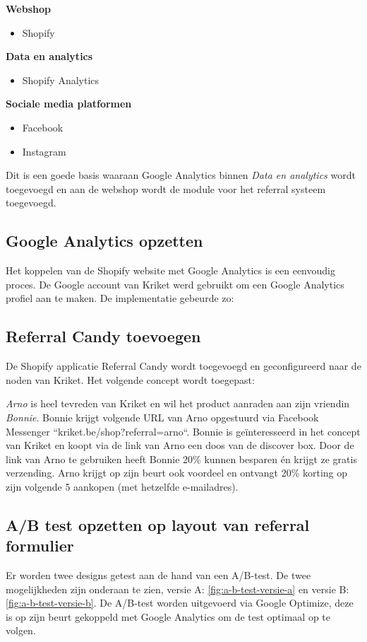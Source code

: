 \textbf{Webshop}
\begin{itemize}
	\item Shopify
\end{itemize}

\textbf{Data en analytics}
\begin{itemize}
	\item Shopify Analytics
\end{itemize}

\textbf{Sociale media platformen}
\begin{itemize}
	\item Facebook
	\item Instagram
\end{itemize}

Dit is een goede basis waaraan Google Analytics binnen \emph{Data en analytics} wordt toegevoegd en aan de webshop wordt de module voor het referral systeem toegevoegd.

\subsection{Google Analytics opzetten} \label{sec:google-analytics-opzetten}
Het koppelen van de Shopify website met Google Analytics is een eenvoudig proces. De Google account van Kriket werd gebruikt om een Google Analytics profiel aan te maken. De implementatie gebeurde zo:

\subsection{Referral Candy toevoegen} \label{sec:referral-candy-toevoegen}
De Shopify applicatie Referral Candy wordt toegevoegd en geconfigureerd naar de noden van Kriket. Het volgende concept wordt toegepast:

\emph{Arno} is heel tevreden van Kriket en wil het product aanraden aan zijn vriendin \emph{Bonnie}. Bonnie krijgt volgende URL van Arno opgestuurd via Facebook Messenger ``kriket.be/shop?referral=arno``. Bonnie is geïnteresseerd in het concept van Kriket en koopt via de link van Arno een doos van de discover box. Door de link van Arno te gebruiken heeft Bonnie 20\% kunnen besparen én krijgt ze gratis verzending. Arno krijgt op zijn beurt ook voordeel en ontvangt 20\% korting op zijn volgende 5 aankopen (met hetzelfde e-mailadres).

\subsection{A/B test opzetten op layout van referral formulier} \label{sec:a-b-test-opzetten}
Er worden twee designs getest aan de hand van een A/B-test. De twee mogelijkheden zijn onderaan te zien, versie A: \ref{fig:a-b-test-versie-a} en versie B: \ref{fig:a-b-test-versie-b}. De A/B-test worden uitgevoerd via Google Optimize, deze is op zijn beurt gekoppeld met Google Analytics om de test optimaal op te volgen.

